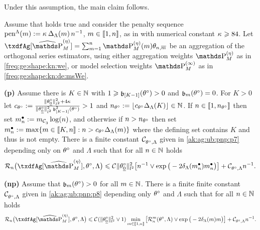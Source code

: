 Under this assumption, the main claim follows.
\begin{thm}
Assume that  holds true and consider the penalty sequence $\penSv:=\penD$, $\Di\in\nset{1,n}$, as in  with numerical constant $\cpen \geq 84$.
Let $\txdfAg[{\erWe[]}]=\sum_{\Di=1}^{\ssY}\We\txdfPr$ be an aggregation of the orthogonal series estimators, using either aggregation weights $\rWe[]$ as in \eqref{freq:ge:shape:kn:we}, or model selection weights $\msWe[]$ as in \eqref{freq:ge:shape:kn:de:msWe}.
\begin{Liste}[]
\item[{\dgrau\bfseries{(p)}}]Assume there is $K\in\Nz$
  with   $1\geq \bias[{[K-1] }](\xdf)>0$ and $\bias[\Di](\xdf)=0$. For
  $K>0$ let
  $ c_{\xdf}:=\tfrac{\Vnormlp{\xdf_{\underline{0}}}^2+4\cpen}{\Vnormlp{\xdf_{\underline{0}}}^2\bias[{[K-1]}]^2(\xdf)}>1$ and
  $\ssY_{\xdf}:=\gauss{c_{\xdf}\DipenSv[K]}\in\Nz$. If
  $\ssY\in\nset{1,\ssY_{\xdf}}$ then set $\sDi{\ssY}:=\Di_{\cst{3}}\log(\ssY)$, and otherwise if
  $\ssY>\ssY_{\xdf}$ then set
  $\sDi{\ssY}:=\max\{\Di\in\nset{K,\ssY}:\ssY>c_{\xdf}\DipenSv\}$
  where the defining set contains $K$ and thus is not empty.
There is a finite constant $\cst{\xdf,\Lambda}$
given in \eqref{ak:ag:ub:pnp:p7} depending only on $\xdf$ and $\Lambda$ such that for all $n\in\Nz$ holds
\begin{equation}
  \nRi{\txdfAg[{\erWe[]}]}{\xdf,\Lambda}
  \leq
  \cst{}\Vnormlp{\xdf_{\underline{0}}}^2\big[
  \ssY^{-1}\vee\exp\big(-2\cmiSv[\sDi{\ssY}]\sDi{\ssY}\big)\big]
  + \cst{\xdf,\Lambda}\ssY^{-1}.
\end{equation}
\item[{\dgrau\bfseries{(np)}}] Assume that
  $\bias(\xdf)>0$ for all  $\Di\in\Nz$.
There is a finite finite constant $\cst{\xdf,\Lambda}$ given in
\eqref{ak:ag:ub:pnp:p8} depending only $\xdf$ and $\Lambda$ such that for all
$\ssY\in\Nz$  holds 
 \begin{equation}
   \nRi{\txdfAg[{\erWe[]}]}{\xdf,\Lambda}
    \leq 
   \cst{}(\Vnormlp{\xdf_{\underline{0}}}^2\vee1)\min_{\Di\in\nset{1,\ssY}}\big[\dRa{\Di}{\xdf,\Lambda}\vee\exp\big(-2\cmiSv\Di\big)\big]\\
   +\cst{\xdf,\Lambda}\ssY^{-1}.
\end{equation}
\end{Liste} 
\reEnd 
\end{thm}

